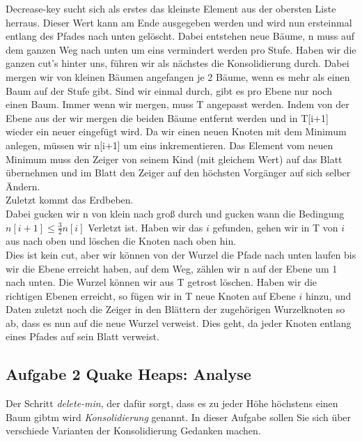 \documentclass[11pt,a4paper,ngerman]{article}
\begin{document}
Decrease-key sucht sich als erstes das kleinste Element aus der obersten Liste herraus. Dieser Wert kann am Ende ausgegeben werden und wird nun ersteinmal entlang des Pfades nach unten gelöscht. Dabei entstehen neue Bäume, n muss auf dem ganzen Weg nach unten um eins vermindert werden pro Stufe. Haben wir die ganzen cut's hinter uns, führen wir als nächstes die Konsolidierung durch. Dabei mergen wir von kleinen Bäumen angefangen je 2 Bäume, wenn es mehr als einen Baum auf der Stufe gibt. Sind wir einmal durch, gibt es pro Ebene nur noch einen Baum. Immer wenn wir mergen, muss T angepasst werden. Indem von der Ebene aus der wir mergen die beiden Bäume entfernt werden und in T[i+1] wieder ein neuer eingefügt wird. Da wir einen neuen Knoten mit dem Minimum anlegen, müssen wir n[i+1] um eins inkrementieren. Das Element vom neuen Minimum muss den Zeiger von seinem Kind (mit gleichem Wert) auf das Blatt übernehmen und im Blatt den Zeiger auf den höchsten Vorgänger auf sich selber Ändern.\\
Zuletzt kommt das Erdbeben.\\
Dabei gucken wir n von klein nach groß durch und gucken wann die Bedingung $n[i+1] \leq \frac{3}{2} n[i]$ Verletzt ist. Haben wir das $i$ gefunden, gehen wir in T von $i$ aus nach oben und löschen die Knoten nach oben hin.\\
Dies ist kein cut, aber wir können von der Wurzel die Pfade nach unten laufen bis wir die Ebene erreicht haben, auf dem Weg, zählen wir n auf der Ebene um 1 nach unten. Die Wurzel können wir aus T getrost löschen. Haben wir die richtigen Ebenen erreicht, so fügen wir in T neue Knoten auf Ebene $i$ hinzu, und Daten zuletzt noch die Zeiger in den Blättern der zugehörigen Wurzelknoten so ab, dass es nun auf die neue Wurzel verweist. Dies geht, da jeder Knoten entlang eines Pfades auf sein Blatt verweist.

\subsection*{Aufgabe 2 \mdseries Quake Heaps: Analyse}

Der Schritt \emph{delete-min}, der dafür sorgt, dass es zu jeder Höhe höchstens einen Baum gibtm wird \emph{Konsolidierung} genannt. In dieser Aufgabe sollen Sie sich über verschiede Varianten der Konsolidierung Gedanken machen.\\
\end{document}

